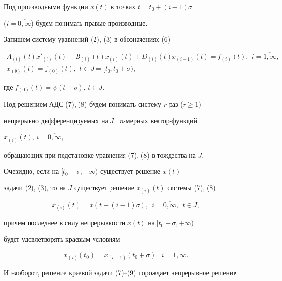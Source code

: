 Под производными функции $x(t)$ в точках $t=t_0+(i-1) \sigma$


($i=\overline{0,\infty }$) будем понимать правые производные.





Запишем систему уравнений (2), (3) в обозначениях (6)


\begin{gather}


A_{(i)}(t)x'_{(i)}(t)+B_{(i)}(t)x_{(i)}(t)+D_{(i)}(t)x_{(i-1)}(t)=


f_{(i)}(t), \ \ i=\overline{1,\infty}, \\


%


x_{(0)}(t)=f_{(0)}(t), \ \ t \in J=[t_0,t_0+\sigma),


\end{gather}


где $f_{(0)}(t)=\psi(t-\sigma)$, $t \in J$.





Под решением АДС (7), (8) будем понимать систему $r$ раз ($r\ge 1$)


непрерывно дифференцируемых на $J$ \ $n$-мерных вектор-функций


$x_{(i)}(t)$, $i=\overline{0, \infty }$,


обращающих при подстановке уравнения (7), (8) в тождества на $J$.





Очевидно, если на $[t_0-\sigma, +\infty)$ существует решение $x(t)$


задачи (2), (3), то на $J$ существует решение $x_{(i)}(t)$ системы (7), (8)


$$


x_{(i)}(t)=x(t+(i-1)\sigma),\ \ i=\overline{0,\infty},\ \ t \in J,


$$


причем последнее в силу непрерывности $x(t)$ на $[t_0-\sigma, +\infty)$


будет удовлетворять краевым условиям


\begin{equation}


x_{(i)}(t_0)=x_{(i-1)}(t_0+\sigma), \ \ i=\overline{1,\infty}.


\end{equation}


И наоборот, решение краевой задачи (7)--(9) порождает непрерывное решение


